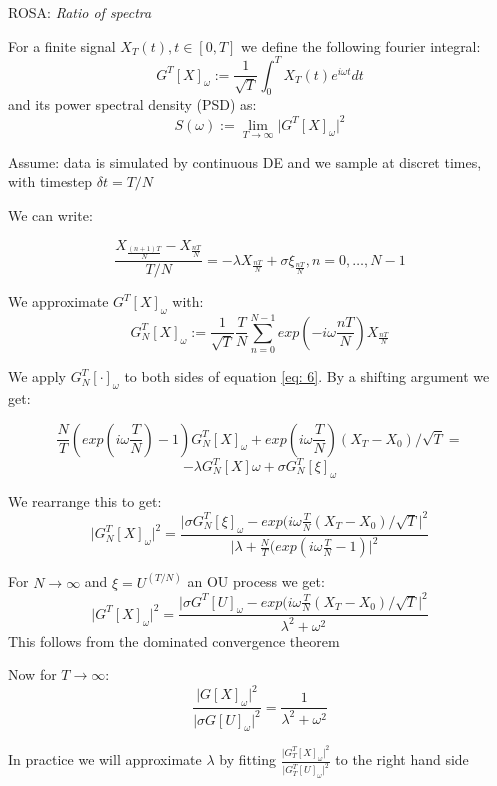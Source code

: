 \documentclass[%
thesis=student,%
coverpage=false,%
titlepage=false,%
headmarks=true, %
german,%
font=libertine, %
math=newpxtx, %
BCOR=5mm,%
coverBCOR=11mm%
]{tumbook}
\begin{document}
ROSA: \textit{Ratio of spectra}

For a finite signal $X_{T}(t), t \in [0,T]$ we define the following fourier integral:
    \[
    G^{T}[X]_{\omega} := \frac{1}{\sqrt{T}}\int_{0}^{T}X_{T}(t)e^{i\omega t}dt
    \]
    and its power spectral density (PSD) as: 
    \[
    S(\omega) := \lim_{T\rightarrow\infty} \lvert G^{T}[X]_{\omega}\rvert ^2
    \]

Assume: data is simulated by continuous DE and we sample at discret times, with timestep $\delta t = T/N$

We can write: 
        
        \begin{equation}  
        \frac{X_{\frac{(n+1)T}{N}}-X_{\frac{nT}{N}}}{T/N} = -\lambda X_{\frac{nT}{N}} + \sigma \xi_{\frac{nT}{N}}, n = 0, \dots, N-1 \label{eq: 6}
        \end{equation}


We approximate $G^{T}[X]_{\omega}$ with: 
        \[
        G_{N}^{T}[X]_{\omega}:= \frac{1}{\sqrt{T}}\frac{T}{N}\sum_{n=0}^{N-1}exp(-i\omega\frac{nT}{N})X_{\frac{nT}{N}}
        \]


We apply $G_{N}^{T}[\cdot]_{\omega}$ to both sides of equation \ref{eq: 6}. By a shifting argument we get: 
        
    \[
    \frac{N}{T}(exp(i\omega\frac{T}{N})-1)G_{N}^{T}[X]_{\omega} + exp(i\omega\frac{T}{N})(X_{T}-X_{0})/\sqrt{T} = 
    \]
    \[
     -\lambda G_{N}^{T}[X]\omega + \sigma G_{N}^{T}[\xi]_{\omega}
    \]

We rearrange this to get:
    \[
    \lvert G_{N}^{T}[X]_{\omega}\rvert ^2 = \frac{\lvert \sigma G_{N}^{T}[\xi]_{\omega} - exp(i\omega\frac{T}{N}(X_{T}-X_{0})/\sqrt{T}\rvert ^2}{\lvert \lambda + \frac{N}{T}(exp(i\omega\frac{T}{N} - 1)\rvert^2}
    \]

For $N \rightarrow \infty$ and $\xi = U^{(T/N)}$  an OU process we get: 
        \[
        \lvert G^{T}[X]_{\omega} \rvert^2 = \frac{\lvert\sigma G^{T}[U]_{\omega} - exp(i\omega\frac{T}{N}(X_{T}-X_{0})/\sqrt{T}\rvert ^2}{\lambda^2 + \omega^2}
        \]
        This follows from the dominated convergence theorem


Now for $T \rightarrow \infty$:
     \[
        \frac{\lvert G[X]_{\omega} \rvert^2}{\lvert\sigma G[U]_{\omega}\rvert^2} = \frac{1}{\lambda^2 + \omega^2}
     \]

In practice we will approximate $\lambda$ by fitting $\frac{\lvert G_{T}^{T}[X]_{\omega} \rvert ^2}{\lvert G_{T}^{T}[U]_{\omega} \rvert ^2}$ to the right hand side
\end{document}
